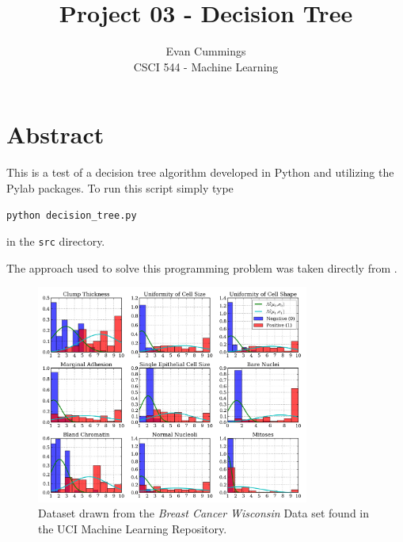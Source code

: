 
\DeclareMathOperator*{\argmax}{arg\,max}

\usepackage[top=.5in, bottom=.5in, left=.5in, right=.5in]{geometry}
\usepackage{natbib}


\small

\title{Project 03 - Decision Tree}
\author{Evan Cummings\\
CSCI 544 - Machine Learning}

\maketitle

\section*{Abstract}

This is a test of a decision tree algorithm developed in Python and utilizing the Pylab packages.  To run this script simply type

\begin{center} \texttt{python decision\_tree.py} \end{center}

\noindent in the \texttt{src} directory.

The approach used to solve this programming problem was taken directly from \cite{mitchell}. 

\begin{figure}[H]
  \centering
		\includegraphics[width=0.8\textwidth]{images/DT.png}
  \caption{\scriptsize Dataset drawn from the \emph{Breast Cancer Wisconsin} Data set found in the UCI Machine Learning Repository.}
\end{figure}

